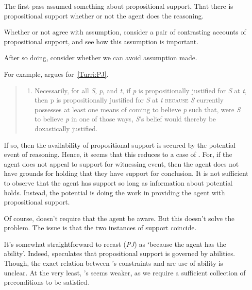 \begin{note}[Overview]
  The first pass assumed something about propositional support.
  That there is propositional support whether or not the agent does the reasoning.

  Whether or not agree with assumption, consider a pair of contrasting accounts of propositional support, and see how this assumption is important.

  After so doing, consider whether we can avoid assumption made.
\end{note}

\begin{note}
  For example, \citeauthor{Turri:2010aa} argues for~\ref{Turri:PJ}.
  \begin{quote}
    \begin{enumerate}[label=(\textbf{PJ}), ref=(\textbf{PJ})]
    \item\label{Turri:PJ} Necessarily, for all \emph{S}, \emph{p}, and \emph{t}, if \emph{p} is propositionally justified for \emph{S} at \emph{t}, then p\emph{} is propositionally justified for \emph{S} at \emph{t} \textsc{because} \emph{S} currently possesses at least one means of coming to believe \emph{p} such that, were \emph{S} to believe \emph{p} in one of those ways, \emph{S}'s belief would thereby be doxastically justified.
    \end{enumerate}
  \end{quote}
  If so, then the availability of propositional support is secured by the potential event of reasoning.
  Hence, it seems that this reduces to a case of \AR{}.
  For, if the agent does not appeal to support for witnessing event, then the agent does not have grounds for holding that they have support for conclusion.
  It is not sufficient to observe that the agent has support so long as information about potential holds.
  Instead, the potential is doing the work in providing the agent with propositional support.

  Of course, \citeauthor{Turri:2010aa} doesn't require that the agent be aware.
  But this doesn't solve the problem.
  The issue is that the two instances of support coincide.

  It's somewhat straightforward to recast (\emph{PJ}) as `because the agent has the ability'.
  Indeed, \citeauthor{Turri:2010aa} speculates that propositional support is governed by abilities.
  Though, the exact relation between \citeauthor{Turri:2010aa}'s constraints and are use of ability is unclear.
  At the very least, \citeauthor{Turri:2010aa}'s seems weaker, as we require a sufficient collection of preconditions to be satisfied.
\end{note}

